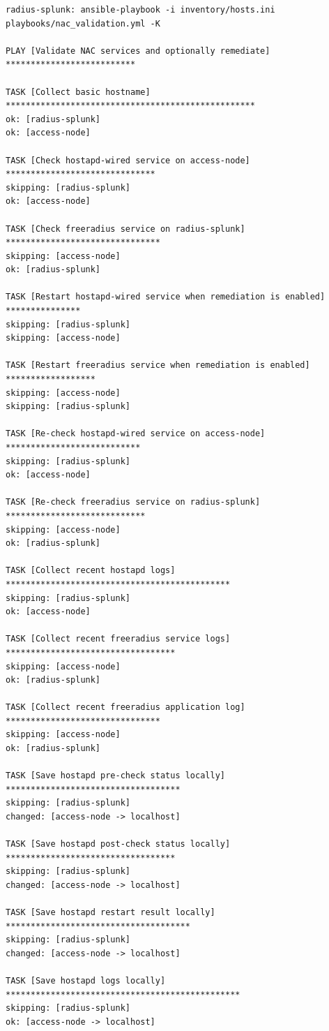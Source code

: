 \documentclass[11pt]{article}
\begin{document}
\begin{verbatim}
radius-splunk: ansible-playbook -i inventory/hosts.ini playbooks/nac_validation.yml -K

PLAY [Validate NAC services and optionally remediate] **************************

TASK [Collect basic hostname] **************************************************
ok: [radius-splunk]
ok: [access-node]

TASK [Check hostapd-wired service on access-node] ******************************
skipping: [radius-splunk]
ok: [access-node]

TASK [Check freeradius service on radius-splunk] *******************************
skipping: [access-node]
ok: [radius-splunk]

TASK [Restart hostapd-wired service when remediation is enabled] ***************
skipping: [radius-splunk]
skipping: [access-node]

TASK [Restart freeradius service when remediation is enabled] ******************
skipping: [access-node]
skipping: [radius-splunk]

TASK [Re-check hostapd-wired service on access-node] ***************************
skipping: [radius-splunk]
ok: [access-node]

TASK [Re-check freeradius service on radius-splunk] ****************************
skipping: [access-node]
ok: [radius-splunk]

TASK [Collect recent hostapd logs] *********************************************
skipping: [radius-splunk]
ok: [access-node]

TASK [Collect recent freeradius service logs] **********************************
skipping: [access-node]
ok: [radius-splunk]

TASK [Collect recent freeradius application log] *******************************
skipping: [access-node]
ok: [radius-splunk]

TASK [Save hostapd pre-check status locally] ***********************************
skipping: [radius-splunk]
changed: [access-node -> localhost]

TASK [Save hostapd post-check status locally] **********************************
skipping: [radius-splunk]
changed: [access-node -> localhost]

TASK [Save hostapd restart result locally] *************************************
skipping: [radius-splunk]
changed: [access-node -> localhost]

TASK [Save hostapd logs locally] ***********************************************
skipping: [radius-splunk]
ok: [access-node -> localhost]


\end{verbatim}
\end{document}
